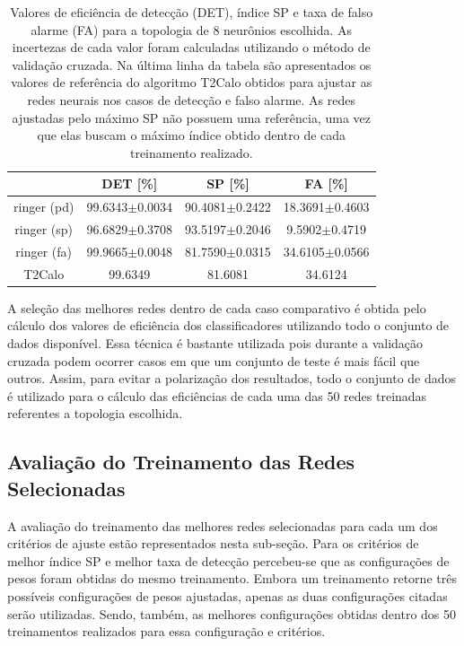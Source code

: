 \begin{table}[]
\centering
\begin{tabular}{cccc}
\hline
 & DET {[}\%{]} & SP {[}\%{]} & FA {[}\%{]} \\ \hline
ringer (pd) & \cellcolor[HTML]{9AFF99}99.6343$\pm$0.0034 & 90.4081$\pm$0.2422 & 18.3691$\pm$0.4603 \\
ringer (sp) & 96.6829$\pm$0.3708 & 93.5197$\pm$0.2046 & 9.5902$\pm$0.4719 \\
ringer (fa) & 99.9665$\pm$0.0048 & 81.7590$\pm$0.0315 & \cellcolor[HTML]{BBDAFF}34.6105$\pm$0.0566 \\ \hline
T2Calo & \cellcolor[HTML]{9AFF99}99.6349 & 81.6081 & \cellcolor[HTML]{BBDAFF}34.6124 \\ \hline
\end{tabular}
\caption[Valores de eficiência de detecção (DET), índice SP e taxa de falso alarme (FA) para a topologia escolhida.]
{Valores de eficiência de detecção (DET), índice SP e taxa de falso alarme (FA) para a topologia de 8 neurônios escolhida. 
As incertezas de cada valor foram calculadas utilizando o método de validação cruzada. Na última linha da tabela são apresentados os valores de referência 
do algoritmo T2Calo obtidos para ajustar as redes neurais nos casos de detecção e falso alarme. As redes ajustadas pelo máximo SP não possuem uma 
referência, uma vez que elas buscam o máximo índice obtido dentro de cada treinamento realizado.}
\label{tab:flutuacao_validacao_cruzada}
\end{table}

A seleção das melhores redes dentro de cada caso comparativo é obtida pelo cálculo dos valores de eficiência dos classificadores utilizando
todo o conjunto de dados disponível. Essa técnica é bastante utilizada pois durante a validação cruzada podem ocorrer casos em que um conjunto
de teste é mais fácil que outros. Assim, para evitar a polarização dos resultados, todo o conjunto de dados é utilizado para o cálculo das 
eficiências de cada uma das 50 redes treinadas referentes a topologia escolhida.


\subsection{Avaliação do Treinamento das Redes Selecionadas}

A avaliação do treinamento das melhores redes selecionadas para cada um dos critérios de ajuste estão representados nesta sub-seção.
Para os critérios de melhor índice SP e melhor taxa de detecção percebeu-se que as configurações de pesos foram obtidas do 
mesmo treinamento. Embora um treinamento retorne três possíveis configurações de pesos ajustadas, apenas as duas configurações
citadas serão utilizadas. Sendo, também, as melhores configurações obtidas dentro dos 50 treinamentos realizados para essa configuração
e critérios.

